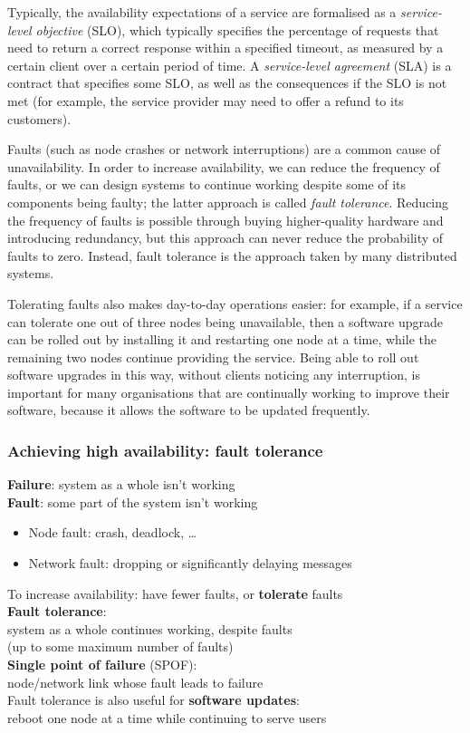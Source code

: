 Typically, the availability expectations of a service are formalised as a \emph{service-level objective} (SLO), which typically specifies the percentage of requests that need to return a correct response within a specified timeout, as measured by a certain client over a certain period of time.
A \emph{service-level agreement} (SLA) is a contract that specifies some SLO, as well as the consequences if the SLO is not met (for example, the service provider may need to offer a refund to its customers).

Faults (such as node crashes or network interruptions) are a common cause of unavailability.
In order to increase availability, we can reduce the frequency of faults, or we can design systems to continue working despite some of its components being faulty; the latter approach is called \emph{fault tolerance}.
Reducing the frequency of faults is possible through buying higher-quality hardware and introducing redundancy, but this approach can never reduce the probability of faults to zero.
Instead, fault tolerance is the approach taken by many distributed systems.

Tolerating faults also makes day-to-day operations easier: for example, if a service can tolerate one out of three nodes being unavailable, then a software upgrade can be rolled out by installing it and restarting one node at a time, while the remaining two nodes continue providing the service.
Being able to roll out software upgrades in this way, without clients noticing any interruption, is important for many organisations that are continually working to improve their software, because it allows the software to be updated frequently.

\begin{frame}
    \label{s:fault-tolerance}
    \frametitle{Achieving high availability: fault tolerance}
    \textbf{Failure}: system as a whole isn't working\\
    \textbf{Fault}: some part of the system isn't working
    \begin{itemize}
        \item Node fault: crash, deadlock, \dots
        \item Network fault: dropping or significantly delaying messages\pause\\[1em]
    \end{itemize}
    To increase availability: have fewer faults, or \textbf{tolerate} faults\\[1em]
    \textbf{Fault tolerance}:\\system as a whole continues working, despite faults\\
    (up to some maximum number of faults)\pause\\[1em]
    \textbf{Single point of failure} (SPOF):\\ node/network link whose fault leads to failure\\[1em]
    Fault tolerance is also useful for \textbf{software updates}:\\ reboot one node at a time while continuing to serve users
\end{frame}
\label{l:fault-tolerance}

